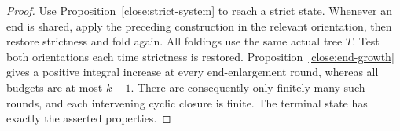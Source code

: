 \begin{proof}
Use Proposition~\ref{close:strict-system} to reach a strict state.
Whenever an end is shared, apply the preceding construction in the
relevant orientation, then restore strictness and fold again. All
foldings use the same actual tree $T$. Test both orientations each
time strictness is restored. Proposition~\ref{close:end-growth} gives
a positive integral increase at every end-enlargement round, whereas
all budgets are at most $k-1$. There are consequently only finitely
many such rounds, and each intervening cyclic closure is finite.
The terminal state has exactly the asserted properties.
\end{proof}
